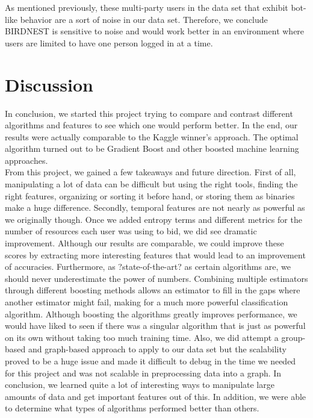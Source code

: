 \documentclass{article} %
\begin{document}

As mentioned previously, these multi-party users in the data set that exhibit bot-like behavior are a sort of noise in our data set. Therefore, we conclude BIRDNEST is sensitive to noise and would work better in an environment where users are limited to have one person logged in at a time. 


\section{Discussion}
In conclusion, we started this project trying to compare and contrast different algorithms and features to see which one would perform better. In the end, our results were actually comparable to the Kaggle winner's approach. The optimal algorithm turned out to be Gradient Boost and other boosted machine learning approaches. \\

From this project, we gained a few takeaways and future direction. First of all, manipulating a lot of data can be difficult but using the right tools, finding the right features, organizing or sorting it before hand, or storing them as binaries make a huge difference. Secondly, temporal features are not nearly as powerful as we originally though. Once we added entropy terms and different metrics for the number of resources each user was using to bid, we did see dramatic improvement. Although our results are comparable, we could improve these scores by extracting more interesting features that would lead to an improvement of accuracies. Furthermore, as ?state-of-the-art? as certain algorithms are, we should never underestimate the power of numbers. Combining multiple estimators through different boosting methods allows an estimator to fill in the gaps where another estimator might fail, making for a much more powerful classification algorithm. Although boosting the algorithms greatly improves performance, we would have liked to seen if there was a singular algorithm that is just as powerful on its own without taking too much training time. Also, we did attempt a group-based and graph-based approach to apply to our data set but the scalability proved to be a huge issue and made it difficult to debug in the time we needed for this project and was not scalable in preprocessing data into a graph. In conclusion, we learned quite a lot of interesting ways to manipulate large amounts of data and get important features out of this. In addition, we were able to determine what types of algorithms performed better than others.
\end{document}
